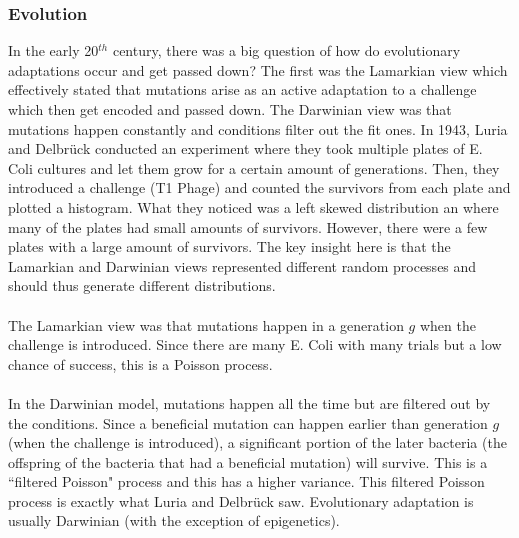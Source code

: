 \documentclass{article}
\theoremstyle{definition}
\begin{document}
\subsubsection{Evolution}
In the early 20$^{th}$ century, there was a big question of how do evolutionary adaptations occur and get passed down? The first was the Lamarkian view which effectively stated that mutations arise as an active adaptation to a challenge which then get encoded and passed down. The Darwinian view was that mutations happen constantly and conditions filter out the fit ones. In 1943, Luria and Delbr\"uck conducted an experiment where they took multiple plates of E. Coli cultures and let them grow for a certain amount of generations. Then, they introduced a challenge (T1 Phage) and counted the survivors from each plate and plotted a histogram. What they noticed was a left skewed distribution an where many of the plates had small amounts of survivors. However, there were a few plates with a large amount of survivors. The key insight here is that the Lamarkian and Darwinian views represented different random processes and should thus generate different distributions. \\\\
The Lamarkian view was that mutations happen in a generation $g$ when the challenge is introduced. Since there are many E. Coli with many trials but a low chance of success, this is a Poisson process. \\\\
In the Darwinian model, mutations happen all the time but are filtered out by the conditions. Since a beneficial mutation can happen earlier than generation $g$ (when the challenge is introduced), a significant portion of the later bacteria (the offspring of the bacteria that had a beneficial mutation) will survive. This is a ``filtered Poisson" process and this has a higher variance. This filtered Poisson process is exactly what Luria and Delbr\"uck  saw. Evolutionary adaptation is usually Darwinian (with the exception of epigenetics). 
\end{document}

